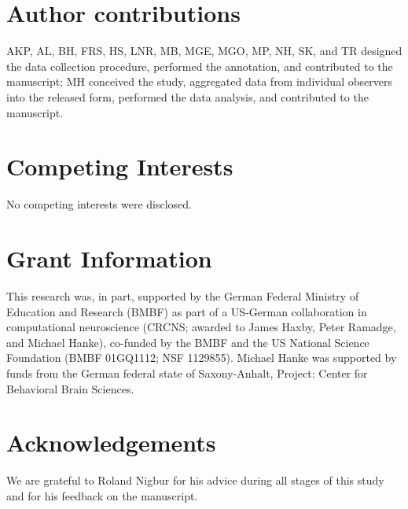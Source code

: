 \documentclass[10pt,a4paper,twocolumn]{article}
\begin{document}
\section*{Author contributions}
AKP, AL, BH, FRS, HS, LNR, MB, MGE, MGO, MP, NH, SK, and TR designed the data
collection procedure, performed the annotation, and contributed to the
manuscript; MH conceived the study, aggregated data from individual observers
into the released form, performed the data analysis, and contributed to the
manuscript.

\section*{Competing Interests}
No competing interests were disclosed.

\section*{Grant Information}

This research was, in part, supported by the German Federal Ministry of
Education and Research (BMBF) as part of a US-German collaboration in
computational neuroscience (CRCNS; awarded to James Haxby, Peter Ramadge, and
Michael Hanke), co-funded by the BMBF and the US National Science Foundation
(BMBF 01GQ1112; NSF 1129855). Michael Hanke was supported by funds from the
German federal state of Saxony-Anhalt, Project: Center for Behavioral Brain
Sciences.

\section*{Acknowledgements}

We are grateful to Roland Nigbur for his advice during all stages of this
study and for his feedback on the manuscript.

{\small
}
\end{document}
